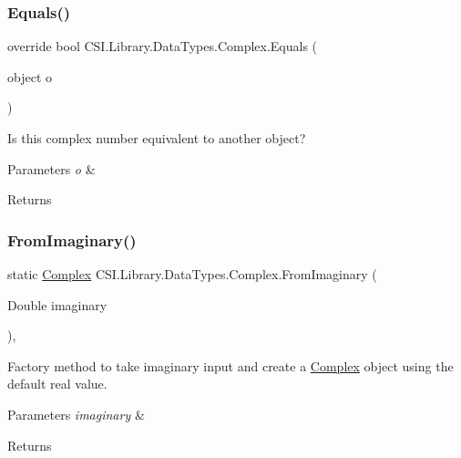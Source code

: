 \subsubsection{\texorpdfstring{Equals()}{Equals()}}
{\footnotesize\ttfamily override bool C\+S\+I.\+Library.\+Data\+Types.\+Complex.\+Equals (\begin{DoxyParamCaption}\item[{object}]{o }\end{DoxyParamCaption})\hspace{0.3cm}{\ttfamily [inline]}}



Is this complex number equivalent to another object? 


\begin{DoxyParams}{Parameters}
{\em o} & \\
\hline
\end{DoxyParams}
\begin{DoxyReturn}{Returns}

\end{DoxyReturn}
\mbox{\label{struct_c_s_i_1_1_library_1_1_data_types_1_1_complex_a993f2fc3375632789eb3cd6624edd17c}} 
\subsubsection{\texorpdfstring{FromImaginary()}{FromImaginary()}}
{\footnotesize\ttfamily static \mbox{\hyperlink{struct_c_s_i_1_1_library_1_1_data_types_1_1_complex}{Complex}} C\+S\+I.\+Library.\+Data\+Types.\+Complex.\+From\+Imaginary (\begin{DoxyParamCaption}\item[{Double}]{imaginary }\end{DoxyParamCaption})\hspace{0.3cm}{\ttfamily [inline]}, {\ttfamily [static]}}



Factory method to take imaginary input and create a \mbox{\hyperlink{struct_c_s_i_1_1_library_1_1_data_types_1_1_complex}{Complex}} object using the default real value. 


\begin{DoxyParams}{Parameters}
{\em imaginary} & \\
\hline
\end{DoxyParams}
\begin{DoxyReturn}{Returns}

\end{DoxyReturn}
\mbox{\label{struct_c_s_i_1_1_library_1_1_data_types_1_1_complex_aa39afe9b672a721837776ae09c85188f}} 
